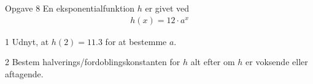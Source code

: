 \newpage
\begin{opgavetekst}{Opgave 8}
	En eksponentialfunktion $h$ er givet ved
	\begin{align*}
		h(x) = 12\cdot a^x
	\end{align*}
\end{opgavetekst}
\begin{delopgave}{}{1}
	Udnyt, at $h(2) = 11.3$ for at bestemme $a$.
\end{delopgave}
\begin{delopgave}{}{2}
	Bestem halverings/fordoblingskonstanten for $h$ alt efter om $h$ er voksende eller aftagende. 
\end{delopgave}

